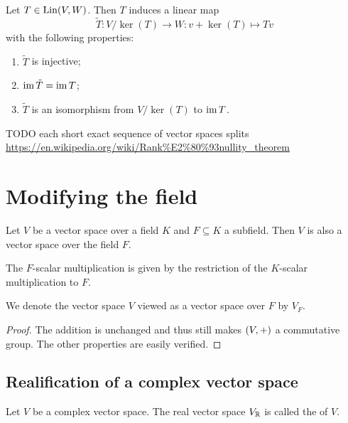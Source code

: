 \begin{proposition} \label{splittingMap}
Let $T\in \operatorname{Lin}(V,W)$. Then $T$ induces a linear map
\[ \tilde{T}: V/\ker(T) \to W: v +\ker(T) \mapsto Tv \]
with the following properties:
\begin{enumerate}
\item $\tilde{T}$ is injective;
\item $\operatorname{im}\tilde{T} = \operatorname{im} T$;
\item $\tilde{T}$ is an isomorphism from $V/\ker(T)$ to $\operatorname{im} T$.
\end{enumerate}
\end{proposition}

 TODO each short exact sequence of vector spaces splits \url{https://en.wikipedia.org/wiki/Rank%E2%80%93nullity_theorem}


\section{Modifying the field}
\begin{proposition} \label{subfieldVectorSpace}
Let $V$ be a vector space over a field $K$ and $F\subseteq K$ a subfield. Then $V$ is also a vector space over the field $F$. 
\end{proposition}
The $F$-scalar multiplication is given by the restriction of the $K$-scalar multiplication to $F$.

We denote the vector space $V$ viewed as a vector space over $F$ by $V_F$.
\begin{proof}
The addition is unchanged and thus still makes $\sSet{V,+}$ a commutative group. The other properties are easily verified.
\end{proof}

\subsection{Realification of a complex vector space}
\begin{definition}
Let $V$ be a complex vector space. The real vector space $V_{\mathbb{R}}$ is called the  of $V$.
\end{definition}


